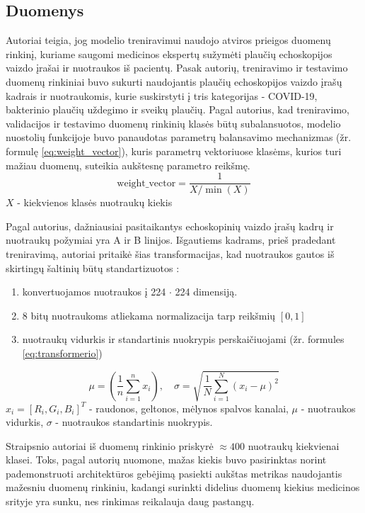 \documentclass[fleqn]{VUMIFKompMagistrinis}
\begin{document}
\subsection{Duomenys}\label{sec:duomenys1}
Autoriai teigia, jog modelio treniravimui naudojo atviros prieigos duomenų rinkinį, kuriame saugomi medicinos ekspertų sužymėti plaučių echoskopijos vaizdo įrašai ir nuotraukos iš pacientų\cite{PAY21}. Pasak autorių, treniravimo ir testavimo duomenų rinkiniai buvo sukurti naudojantis plaučių echoskopijos vaizdo įrašų kadrais ir nuotraukomis, kurie suskirstyti į tris kategorijas - COVID-19, bakterinio plaučių uždegimo ir sveikų plaučių. Pagal autorius, kad treniravimo, validacijos ir testavimo duomenų rinkinių klasės būtų subalansuotos, modelio nuostolių funkcijoje buvo panaudotas parametrų balansavimo mechanizmas (žr. formulę \ref{eq:weight_vector}), kuris parametrų vektoriuose klasėms, kurios turi mažiau duomenų, suteikia aukštesnę parametro reikšmę.\cite{PAY21}
\begin{equation}\label{eq:weight_vector}
    \text{weight\_vector} = \frac{1}{X/\min(X)}
\end{equation}
\( X \) - kiekvienos klasės nuotraukų kiekis
\par
Pagal autorius, dažniausiai pasitaikantys echoskopinių vaizdo įrašų kadrų ir nuotraukų požymiai yra A ir B linijos. Išgautiems kadrams, prieš pradedant treniravimą, autoriai pritaikė šias transformacijas, kad nuotraukos gautos iš skirtingų šaltinių būtų standartizuotos \cite{PAY21}:
\begin{enumerate}
    \item konvertuojamos nuotraukos į 224 \(\cdot\) 224 dimensiją.
    \item 8 bitų nuotraukoms atliekama normalizacija tarp reikšmių \([0,1]\) 
    \item nuotraukų vidurkis ir standartinis nuokrypis perskaičiuojami (žr. formules \ref{eq:transformerio}) 
\end{enumerate}
\begin{equation}\label{eq:transformerio}
\mu = \left( \frac{1}{n} \sum_{i=1}^{n} x_i \right), \quad
\sigma = \sqrt{\frac{1}{N} \sum_{i=1}^{N} (x_i - \mu)^2}
\end{equation}
\( x_i = [R_i, G_i, B_i]^T \) - raudonos, geltonos, mėlynos spalvos kanalai, \(\mu\) - nuotraukos vidurkis, \(\sigma\) - nuotraukos standartinis nuokrypis. 
\par
Straipsnio autoriai iš duomenų rinkinio priskyrė \(\approx400\) nuotraukų kiekvienai klasei. Toks, pagal autorių nuomone, mažas kiekis buvo pasirinktas norint pademonstruoti architektūros gebėjimą pasiekti aukštas metrikas naudojantis mažesniu duomenų rinkiniu, kadangi surinkti didelius duomenų kiekius medicinos srityje yra sunku, nes rinkimas reikalauja daug pastangų.\cite{PAY21}
\end{document}
